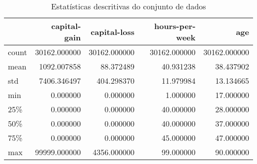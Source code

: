 \begin{table}
\centering
\caption{Estatísticas descritivas do conjunto de dados}
\label{tbl:descriptive_statistics}
\begin{tabular}{lrrrr}
\toprule
{} &  capital-gain &  capital-loss &  hours-per-week &           age \\
\midrule
count &  30162.000000 &  30162.000000 &    30162.000000 &  30162.000000 \\
mean  &   1092.007858 &     88.372489 &       40.931238 &     38.437902 \\
std   &   7406.346497 &    404.298370 &       11.979984 &     13.134665 \\
min   &      0.000000 &      0.000000 &        1.000000 &     17.000000 \\
25\%   &      0.000000 &      0.000000 &       40.000000 &     28.000000 \\
50\%   &      0.000000 &      0.000000 &       40.000000 &     37.000000 \\
75\%   &      0.000000 &      0.000000 &       45.000000 &     47.000000 \\
max   &  99999.000000 &   4356.000000 &       99.000000 &     90.000000 \\
\bottomrule
\end{tabular}
\end{table}
